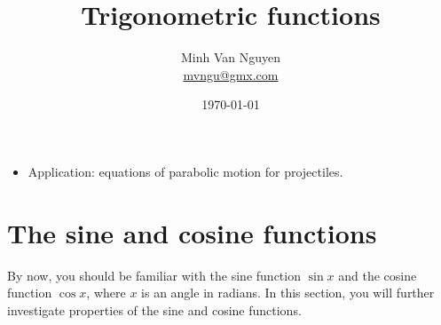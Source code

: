 \documentclass[a4paper,oneside,12pt]{article}
\begin{document}
\title{\Large\bf Trigonometric functions}
\author{%
  Minh Van Nguyen \\
  \url{mvngu@gmx.com}
}
\date{\today}
\maketitle

\begin{itemize}
\item Application: equations of parabolic motion for projectiles.
\end{itemize}



\section{The sine and cosine functions}

By now, you should be familiar with the sine function $\sin x$ and the
cosine function $\cos x$, where $x$ is an angle in radians.  In this
section, you will further investigate properties of the sine and
cosine functions.
\end{document}
